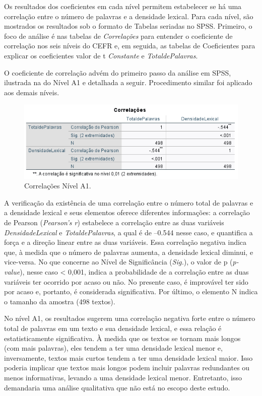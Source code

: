 \documentclass[portuguese]{textolivre}
\begin{document}
Os resultados dos coeficientes em cada nível permitem estabelecer se há uma correlação entre o número de palavras e a densidade lexical. Para cada nível, são mostrados os resultados sob o formato de Tabelas seriadas no SPSS. Primeiro, o foco de análise é nas tabelas de \textit{Correlações} para entender o coeficiente de correlação nos seis níveis do CEFR e, em seguida, as tabelas de Coeficientes para explicar os coeficientes valor de t \textit{Constante} e \textit{TotaldePalavras}.

O coeficiente de correlação advém do primeiro passo da análise em SPSS, ilustrada na  do Nível A1 e detalhada a seguir. Procedimento similar foi aplicado aos demais níveis.

\begin{figure}[h!]
    \centering
    \includegraphics[width=0.8\linewidth]{Fig10.png}
    \caption{Correlações Nível A1.}
    \label{fig10}
\end{figure}

A verificação da existência de uma correlação entre o número total de palavras e a densidade lexical e seus elementos oferece diferentes informações: a correlação de Pearson (\textit{Pearson’s r}) estabelece a correlação entre as duas variáveis \textit{DensidadeLexical} e \textit{TotaldePalavras}, a qual é de –0.544 nesse caso, e quantifica a força e a direção linear entre as duas variáveis. Essa correlação negativa indica que, à medida que o número de palavras aumenta, a densidade lexical diminui, e vice-versa. No que concerne ao Nível de Significância (\textit{Sig.}), o valor de p (\textit{p-value}), nesse caso < 0,001, indica a probabilidade de a correlação entre as duas variáveis ter ocorrido por acaso ou não. No presente caso, é improvável ter sido por acaso e, portanto, é considerada significativa. Por último, o elemento N indica o tamanho da amostra (498 textos).

No nível A1, os resultados sugerem uma correlação negativa forte entre o número total de palavras em um texto e sua densidade lexical, e essa relação é estatisticamente significativa. À medida que os textos se tornam mais longos (com mais palavras), eles tendem a ter uma densidade lexical menor e, inversamente, textos mais curtos tendem a ter uma densidade lexical maior. Isso poderia implicar que textos mais longos podem incluir palavras redundantes ou menos informativas, levando a uma densidade lexical menor. Entretanto, isso demandaria uma análise qualitativa que não está no escopo deste estudo.
\end{document}
